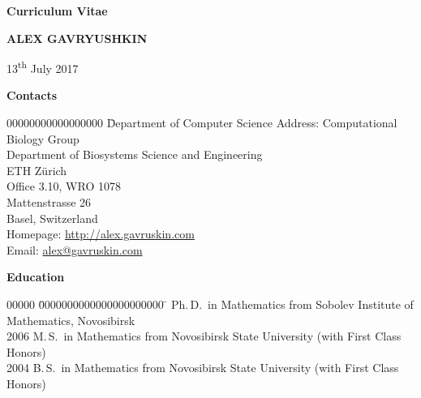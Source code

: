 \documentclass[12pt]{article}
\begin{document}
\centerline{\large \bf Curriculum Vitae}
\vskip5mm
\centerline{\Large \bfseries A\normalsize LEX \Large G\normalsize AVRYUSHKIN}
\vskip5mm
\centerline{13\textsuperscript{th} July 2017}
\vskip5mm

\centerline{\bf Contacts}
\begin{tabbing}
00000000000000000	\= Department of Computer Science	\kill
Address:		\> Computational Biology Group\\
			\> Department of Biosystems Science and Engineering\\
			\> ETH Z\"urich\\
			\> Office 3.10, WRO 1078\\
			\> Mattenstrasse 26\\
			 Basel, Switzerland\\
Homepage:		\> \href{http://alex.gavruskin.com}{http://alex.gavruskin.com}\\
Email:			\> \href{mailto:alex@gavruskin.com}{alex@gavruskin.com}
\end{tabbing}

\centerline{\bf Education}
\begin{tabbing}
00000	\= 0000000000000000000000	\=		\> Ph.\,D.\ in Mathematics	\> from Sobolev Institute of Mathematics, Novosibirsk\\
2006	\> M.\,S.\ in Mathematics	\> from Novosibirsk State University (with First Class Honors)\\
2004	\> B.\,S.\ in Mathematics	\> from Novosibirsk State University (with First Class Honors)
\end{tabbing}
\end{document}
